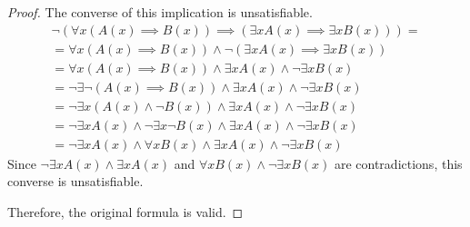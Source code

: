 \documentclass[titlepage, letterpaper, fleqn]{article}
\begin{document}
\begin{proof}
The converse of this implication is unsatisfiable.
\begin{align*}
& \neg (\forall x (A(x) \implies B(x)) \implies (\exists x A(x) \implies \exists x B(x))) = & \tag*{Converse}
\\ & = \forall x (A (x) \implies B(x)) \wedge \neg (\exists x A(x) \implies \exists x B(x)) & \tag*{Material implication \& de Morgan}
\\ & = \forall x (A(x) \implies B(x)) \wedge \exists x A(x) \wedge \neg \exists x B(x) & \tag*{Material implication \& de Morgan}
\\ & = \neg \exists \neg (A(x) \implies B(x)) \wedge \exists x A(x) \wedge \neg \exists x B(x) & \tag*{Duality of quantifiers}
\\ & = \neg \exists x (A(x) \wedge \neg B(x)) \wedge \exists x A(x) \wedge \neg \exists x B(x) & \tag*{Material implication \& de Morgan}
\\ & = \neg \exists x A(x) \wedge \neg \exists x \neg B(x) \wedge \exists x A(x) \wedge \neg \exists x B(x) & \tag*{$\exists$ distributes over $\wedge$}
\\ & = \neg \exists x A(x) \wedge \forall x B(x) \wedge \exists x A(x) \wedge \neg \exists x B(x) & \tag*{Duality of quantifiers}
\end{align*}
Since \(\neg \exists x A(x) \wedge \exists x A(x)\) and \(\forall x B(x) \wedge \neg \exists x B(x)\) are contradictions, this converse is unsatisfiable.

Therefore, the original formula is valid.
\end{proof}
\end{document}
